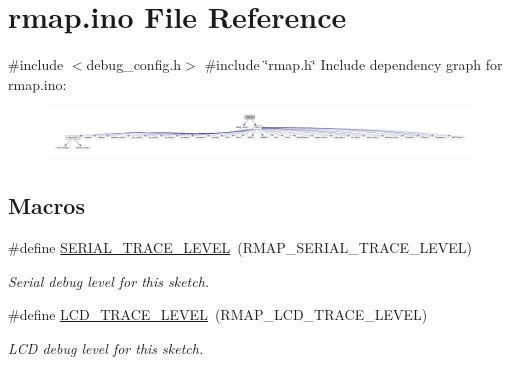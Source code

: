 \hypertarget{rmap_8ino}{}\section{rmap.\+ino File Reference}
\label{rmap_8ino}
{\ttfamily \#include $<$debug\+\_\+config.\+h$>$}\newline
{\ttfamily \#include \char`\"{}rmap.\+h\char`\"{}}\newline
Include dependency graph for rmap.\+ino\+:
\nopagebreak
\begin{figure}[H]
\begin{center}
\leavevmode
\includegraphics[width=350pt]{rmap_8ino__incl}
\end{center}
\end{figure}
\subsection*{Macros}
\begin{DoxyCompactItemize}
\item 
\mbox{\label{rmap_8ino_a31fa5c36fa17c66feec7a67b76c3e786}} 
\#define \hyperlink{rmap_8ino_a31fa5c36fa17c66feec7a67b76c3e786}{S\+E\+R\+I\+A\+L\+\_\+\+T\+R\+A\+C\+E\+\_\+\+L\+E\+V\+EL}~(R\+M\+A\+P\+\_\+\+S\+E\+R\+I\+A\+L\+\_\+\+T\+R\+A\+C\+E\+\_\+\+L\+E\+V\+EL)
\begin{DoxyCompactList}\small\item\em Serial debug level for this sketch. \end{DoxyCompactList}\item 
\mbox{\label{rmap_8ino_acb771fe8deeaa2fee1ad327c0c1be34f}} 
\#define \hyperlink{rmap_8ino_acb771fe8deeaa2fee1ad327c0c1be34f}{L\+C\+D\+\_\+\+T\+R\+A\+C\+E\+\_\+\+L\+E\+V\+EL}~(R\+M\+A\+P\+\_\+\+L\+C\+D\+\_\+\+T\+R\+A\+C\+E\+\_\+\+L\+E\+V\+EL)
\begin{DoxyCompactList}\small\item\em L\+CD debug level for this sketch. \end{DoxyCompactList}\end{DoxyCompactItemize}
